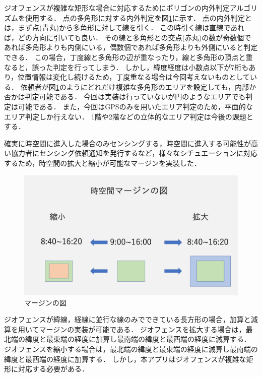 ジオフェンスが複雑な矩形な場合に対応するためにポリゴンの内外判定アルゴリズム\cite{naigai}を使用する．
点の多角形に対する内外判定を図\ref{fig:polygon_2}に示す．
点の内外判定とは，まず点(青丸)から多角形に対して線を引く．
この時引く線は直線であれば，どの方向に引いても良い．
その線と多角形との交点(赤丸)の数が奇数個であれば多角形よりも内側にいる，偶数個であれば多角形よりも外側にいると判定できる．
この場合，丁度線と多角形の辺が重なったり，線と多角形の頂点と重なると，誤った判定を行ってしまう．
しかし，緯度経度は小数点以下が7桁もあり，位置情報は変化し続けるため，丁度重なる場合は今回考えないものとしている．
依頼者が図\ref{fig:polygon_2}のようにどれだけ複雑な多角形のエリアを設定しても，内部か否かは判定可能である．
今回は実装は行っていないが円のようなエリアでも判定は可能である．
また，今回はGPSのみを用いたエリア判定のため，平面的なエリア判定しか行えない．
1階や2階などの立体的なエリア判定は今後の課題とする．

確実に時空間に進入した場合のみセンシングする，時空間に進入する可能性が高い協力者にセンシング依頼通知を発行するなど，様々なシチュエーションに対応するため，時空間の拡大と縮小が可能なマージンを実装した．

\begin{figure}[tbh]
    \centering
    \includegraphics[width=16cm]{img_margin_1.png}
    \caption{マージンの図}
    \label{fig:polygon_2}
\end{figure}

ジオフェンスが緯線，経線に並行な線のみでできている長方形の場合，加算と減算を用いてマージンの実装が可能である．
ジオフェンスを拡大する場合は，最北端の緯度と最東端の経度に加算し最南端の緯度と最西端の経度に減算する．
ジオフェンスを縮小する場合は，最北端の緯度と最東端の経度に減算し最南端の緯度と最西端の経度に加算する．
しかし，本アプリはジオフェンスが複雑な矩形に対応する必要がある．


